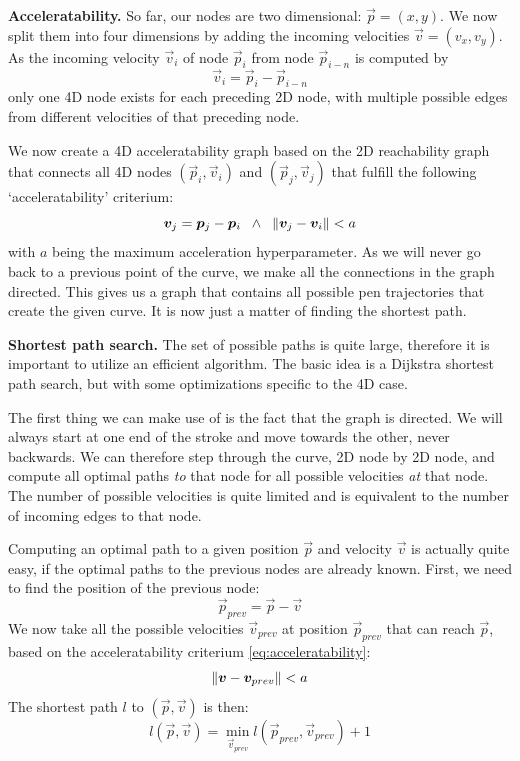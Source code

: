 \textbf{Acceleratability.} So far, our nodes are two dimensional: $\vec{p} = (x, y)$. We now split them into four dimensions by adding the incoming velocities $\vec{v} = (v_x, v_y)$. As the incoming velocity $\vec{v}_i$ of node $\vec{p}_i$ from node $\vec{p}_{i-n}$ is computed by 
\begin{equation}
\vec{v}_i = \vec{p}_i - \vec{p}_{i-n}
\end{equation}
only one 4D node exists for each preceding 2D node, with multiple possible edges from different velocities of that preceding node.

We now create a 4D acceleratability graph based on the 2D reachability graph that connects all 4D nodes $(\vec{p}_i, \vec{v}_i)$ and $(\vec{p}_j, \vec{v}_j)$ that fulfill the following `acceleratability' criterium:
\begin{equation}\label{eq:acceleratability}
\bm v_j = \bm p_j - \bm p_i \;\; \land \;\; {\mathord{\| \bm v_j - \bm v_i \|}} < a
\end{equation}
with $a$ being the maximum acceleration hyperparameter. As we will never go back to a previous point of the curve, we make all the connections in the graph directed. This gives us a graph that contains all possible pen trajectories that create the given curve. It is now just a matter of finding the shortest path.

\textbf{Shortest path search.}
The set of possible paths is quite large, therefore it is important to utilize an efficient algorithm. The basic idea is a Dijkstra shortest path search, but with some optimizations specific to the 4D case.

The first thing we can make use of is the fact that the graph is directed. We will always start at one end of the stroke and move towards the other, never backwards. We can therefore step through the curve, 2D node by 2D node, and compute all optimal paths \emph{to} that node for all possible velocities \emph{at} that node. The number of possible velocities is quite limited and is equivalent to the number of incoming edges to that node.

Computing an optimal path to a given position $\vec{p}$ and velocity $\vec{v}$ is actually quite easy, if the optimal paths to the previous nodes are already known. First, we need to find the position of the previous node:
\begin{equation}
\vec{p}_{prev} = \vec{p} - \vec{v}
\end{equation}
We now take all the possible velocities $\vec{v}_{prev}$ at position $\vec{p}_{prev}$ that can reach $\vec{p}$, based on the acceleratability criterium \ref{eq:acceleratability}:
\begin{equation}
{\mathord{\| \ensuremath{\bm v} - \ensuremath{\bm v}_{prev} \|}} < a
\end{equation}
The shortest path $l$ to $(\vec{p}, \vec{v})$ is then:
\begin{equation}
l(\vec{p}, \vec{v}) = \min_{\vec{v}_{prev}} l(\vec{p}_{prev},\vec{v}_{prev}) + 1
\end{equation}

